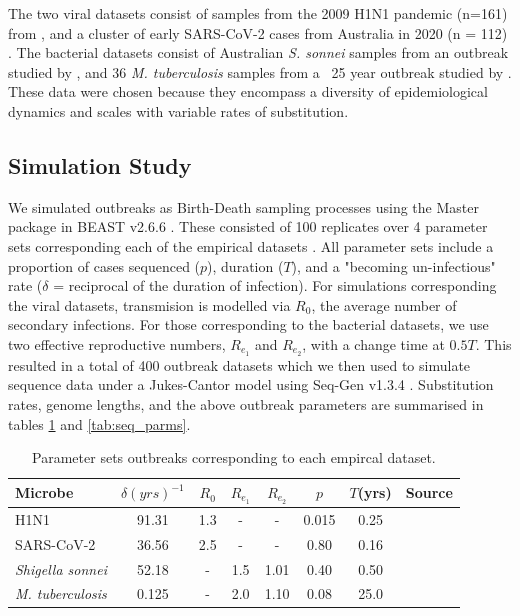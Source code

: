 \documentclass{article}
\begin{document}
\begin{spacing}{1.5}
The two viral datasets consist of samples from the 2009 H1N1 pandemic (n=161) from \citet{hedge_2013_real-time}, and a cluster of early SARS-CoV-2 cases from  Australia in 2020 (n = 112) \citep{lane2021genomics}. The bacterial datasets consist of Australian \textit{S. sonnei} samples from an outbreak studied by \citet{ingle_co-circulation_2019}, and 36 \textit{M. tuberculosis} samples from a ~25 year outbreak studied by \citet{kuhnert_tuberculosis_2018}. These data were chosen because they encompass a diversity of epidemiological dynamics and scales with variable rates of substitution.

\subsection*{Simulation Study}
We simulated outbreaks as Birth-Death sampling processes using the Master package in BEAST v2.6.6 \citep{vaughan_stochastic_2013,bouckaert_beast_2019}. These consisted of 100 replicates over 4 parameter sets corresponding each of the empirical datasets . All parameter sets include a proportion of cases sequenced ($p$), duration ($T$), and a "becoming un-infectious" rate ($\delta$ = reciprocal of the duration of infection). For simulations corresponding the viral datasets, transmision is modelled via $R_0$, the average number of secondary infections. For those corresponding to the bacterial datasets, we use two effective reproductive numbers, $R_{e_1}$ and $R_{e_2}$, with a change time at $0.5T$. This resulted in a total of 400 outbreak datasets which we then used to simulate sequence data under a Jukes-Cantor model using Seq-Gen v1.3.4 \citep{rambaut_seq-gen_1997}. Substitution rates, genome lengths, and the above outbreak parameters are summarised in tables \ref{tab:sim_parms} and \ref{tab:seq_parms}.

\begin{table}[ht]
    \centering
    \caption{Parameter sets outbreaks corresponding to each empircal dataset.}
    \begin{tabular}{l|c|c|c|c|c|c|l|}
    \hline
    Microbe                     &   $\delta (yrs)^{-1}$    & $R_0$ &   $R_{e_1}$   &  $R_{e_2}$    &   $p$   &   $T$(yrs)   & Source \\
    \hline
    H1N1                        &   91.31    & 1.3 &   -   &  -    &   0.015   &   0.25 & \citet{hedge_2013_real-time} \\
    SARS-CoV-2                  &   36.56    & 2.5 &   -   &  -   &   0.80   &  0.16 & \citet{lane2021genomics} \\
    \textit{Shigella sonnei}    &   52.18    &  - &   1.5   &  1.01   &   0.40   &   0.50 & \citet{ingle_co-circulation_2019} \\
    \textit{M. tuberculosis}    &   0.125    &  - &   2.0   &  1.10    &   0.08   &   25.0 & \citet{kuhnert_tuberculosis_2018} \\
    \hline
    \end{tabular}
    \label{tab:sim_parms}
\end{table}


\end{spacing}
\end{document}
